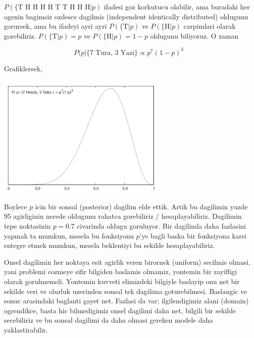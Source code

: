 \documentclass[12pt,fleqn]{article}\usepackage{../common}
\begin{document}
$P(\{\textrm{T H H H H T T H H H} | p)$ ifadesi goz korkutucu olabilir, ama
buradaki her ogenin bagimsiz ozdesce dagilmis (independent identically
distributed) oldugunu gorursek, ama bu ifadeyi ayri ayri
$P(\{\textrm{T}|p)$ ve $P(\{\textrm{H}|p)$ carpimlari olarak gorebiliriz. $P(\{\textrm{T}|p) = p$ ve 
$P(\{\textrm{H}|p)=1-p$ oldugunu biliyoruz. O zaman 

$$ P(p | \{ \textrm{7 Tura, 3 Yazi} \} \propto
p^7(1-p)^3
$$

Grafiklersek, 

\includegraphics[height=6cm]{05_01.png}

Boylece $p$ icin bir sonsal (posterior) dagilim elde ettik. Artik bu
dagilimin yuzde 95 agirliginin nerede oldugunu rahatca gorebiliriz /
hesaplayabiliriz. Dagilimin tepe noktasinin $p=0.7$ civarinda oldugu
goruluyor. Bir dagilimla daha fazlasini yapmak ta mumkun, mesela bu
fonksiyonu $p$'ye bagli baska bir fonksiyona karsi entegre etmek mumkun,
mesela beklentiyi bu sekilde hesaplayabiliriz. 

Onsel dagilimin her noktaya esit agirlik veren birornek (uniform) secilmis
olmasi, yani problemi cozmeye sifir bilgiden baslamis olmamiz, yontemin bir
zayifligi olarak gorulmemeli. Yontemin kuvveti elimizdeki bilgiyle baslayip
onu net bir sekilde veri ve olurluk uzerinden sonsal tek dagilima
goturebilmesi. Baslangic ve sonuc arasindaki baglanti gayet net. Fazlasi da
var; ilgilendigimiz alani (domain) ogrendikce, basta hic bilmedigimiz onsel
dagilimi daha net, bilgili bir sekilde secebiliriz ve bu sonsal dagilimi da
daha olmasi gereken modele daha yaklastirabilir. 
\end{document}
